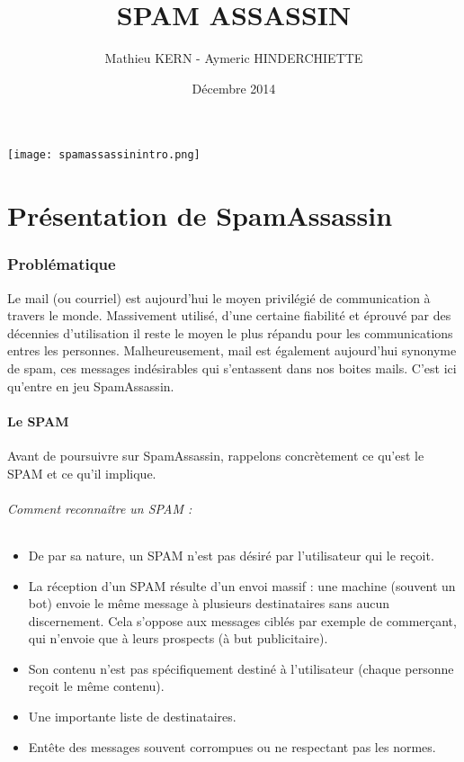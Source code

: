 \documentclass[a4paper,11pt]{article}
\title{SPAM ASSASSIN}
\date{Décembre 2014}
\author{Mathieu KERN - Aymeric HINDERCHIETTE}
\begin{document}
\maketitle
\texttt{[image: spamassassinintro.png]}
\pagebreak

\tableofcontents

\pagebreak

\part{Présentation de SpamAssassin}

\section{Problématique }

  Le mail (ou courriel) est aujourd'hui le moyen privilégié de communication à travers le monde. Massivement utilisé, 
d'une certaine fiabilité et éprouvé par des décennies d'utilisation il reste le moyen le plus répandu pour 
les communications entres les personnes. Malheureusement, mail est également aujourd'hui synonyme de spam, ces messages
indésirables qui s'entassent dans nos boites mails. C'est ici qu'entre en jeu SpamAssassin.

\subsection{Le SPAM}
Avant de poursuivre sur SpamAssassin, rappelons concrètement ce qu'est le SPAM et ce qu'il implique. 

\paragraph{Comment reconnaître un SPAM :}

\begin{itemize}
 \item De par sa nature, un SPAM n'est pas désiré par l'utilisateur qui le reçoit. 
 \item La réception d'un SPAM résulte d'un envoi massif : une machine (souvent un bot) envoie le même message 
 à plusieurs destinataires sans aucun discernement. Cela s'oppose aux messages ciblés par exemple de commerçant,
 qui n’envoie que à leurs prospects (à but publicitaire).
 \item Son contenu n'est pas spécifiquement destiné à l'utilisateur (chaque personne reçoit le même contenu).
 \item Une importante liste de destinataires. 
 \item Entête des messages souvent corrompues ou ne respectant pas les normes.
\end{itemize}
\end{document}
